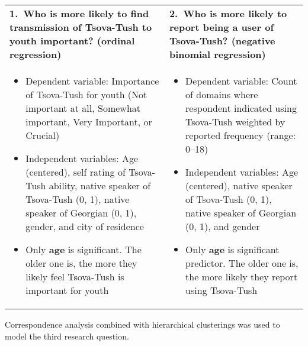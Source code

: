 \documentclass[portrait,fontscale=0.285,a0paper]{baposter2}
\newcommand{\compresslist}{ %
\setlength{\itemsep}{1pt}
\setlength{\parskip}{0pt}
\setlength{\parsep}{0pt}
}
\begin{document}
\begin{poster}
{{\footnotesize
\vspace{0.1in}\begin{tabular}{p{}p{}}
\textbf{1.~Who is more likely to find transmission of Tsova-Tush to youth important? (ordinal regression)} &\textbf{2.~Who is more likely to report being a user of Tsova-Tush? (negative binomial regression)}\\
\vspace{-0.1in}\begin{itemize}[leftmargin=*,rightmargin=0.1in]\compresslist
\item Dependent variable: Importance of Tsova-Tush for youth (Not important at all, Somewhat important, Very Important, or Crucial)
\item Independent variables: Age (centered), self rating of Tsova-Tush ability, native speaker of Tsova-Tush (0, 1), native speaker of Georgian (0, 1), gender, and city of residence
\item Only \textbf{age} is significant. The older one is, the more they likely feel Tsova-Tush is important for youth
\end{itemize}&

\begin{itemize}[leftmargin=*,rightmargin=0.1in]\compresslist
\item \vspace{-0.1in}Dependent variable: Count of domains where respondent indicated using Tsova-Tush weighted by reported frequency (range: 0--18)
\item Independent variables: Age (centered), native speaker of Tsova-Tush (0, 1), native speaker of Georgian (0, 1), and gender
\item Only \textbf{age} is significant predictor. The older one is, the more likely they report using Tsova-Tush
\end{itemize}\\
\end{tabular}
}



{\footnotesize Correspondence analysis combined with hierarchical clusterings was used to model the third research question.\\

}}
\end{poster}
\end{document}
